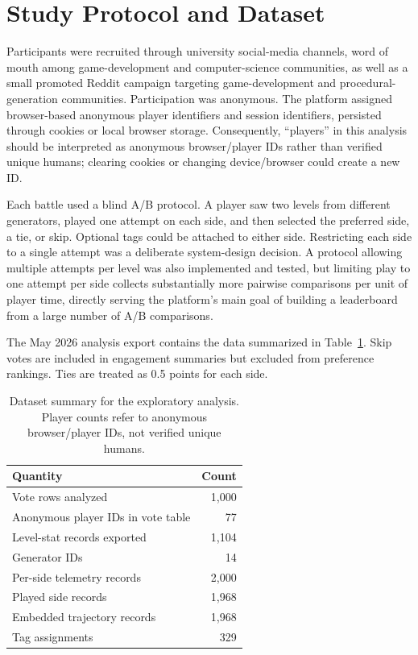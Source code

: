 \documentclass[shortabstract, mgr, english]{iithesis}
\begin{document}
\section{Study Protocol and Dataset}
\label{sec:eda-study-design}

Participants were recruited through university social-media channels, word of mouth among game-development and computer-science communities, as well as a small promoted Reddit campaign targeting game-development and procedural-generation communities. Participation was anonymous. The platform assigned browser-based anonymous player identifiers and session identifiers, persisted through cookies or local browser storage. Consequently, ``players'' in this analysis should be interpreted as anonymous browser/player IDs rather than verified unique humans; clearing cookies or changing device/browser could create a new ID.

Each battle used a blind A/B protocol. A player saw two levels from different generators, played one attempt on each side, and then selected the preferred side, a tie, or skip. Optional tags could be attached to either side. Restricting each side to a single attempt was a deliberate system-design decision. A protocol allowing multiple attempts per level was also implemented and tested, but limiting play to one attempt per side collects substantially more pairwise comparisons per unit of player time, directly serving the platform's main goal of building a leaderboard from a large number of A/B comparisons.

The May 2026 analysis export contains the data summarized in Table~\ref{tab:eda-dataset}. Skip votes are included in engagement summaries but excluded from preference rankings. Ties are treated as 0.5 points for each side.

\begin{table}[H]
\centering
\caption{Dataset summary for the exploratory analysis. Player counts refer to anonymous browser/player IDs, not verified unique humans.}
\label{tab:eda-dataset}
\begin{tabular}{lr}
\toprule
\textbf{Quantity} & \textbf{Count} \\
\midrule
Vote rows analyzed & 1,000 \\
Anonymous player IDs in vote table & 77 \\
Level-stat records exported & 1,104 \\
Generator IDs & 14 \\
Per-side telemetry records & 2,000 \\
Played side records & 1,968 \\
Embedded trajectory records & 1,968 \\
Tag assignments & 329 \\
\bottomrule
\end{tabular}
\end{table}
\end{document}

